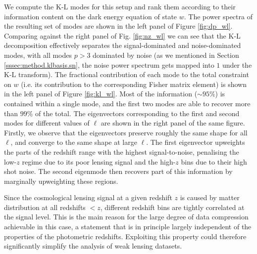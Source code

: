 \documentclass[twocolumn,amsfont,amssymb,amsmath, showpacs,balancelastpage, nofootinbib]{revtex4-1}
\begin{document}
    We compute the K-L modes for this setup and rank them according to their information content on the dark energy equation of state $w$. The power spectra of the resulting set of modes are shown in the left panel of Figure \ref{fig:dp_wl}. Comparing against the right panel of Fig. \ref{fig:nz_wl} we can see that the K-L decomposition effectively separates the signal-dominated and noise-dominated modes, with all modes $p>3$ dominated by noise (as we mentioned in Section \ref{sssec:method.klbasis.sn}, the noise power spectrum gets mapped into $1$ under the K-L transform). The fractional contribution of each mode to the total constraint on $w$ (i.e. its contribution to the corresponding Fisher matrix element) is shown in the left panel of Figure \ref{fig:kl_wl}. Most of the information ($\sim95\%$) is contained within a single mode, and the first two modes are able to recover more than $99\%$ of the total. The eigenvectors corresponding to the first and second modes for different values of $\ell$ are shown in the right panel of the same figure. Firstly, we observe that the eigenvectors preserve roughly the same shape for all $\ell$, and converge to the same shape at large $\ell$. The first eigenvector upweights the parts of the redshift range with the highest signal-to-noise, penalising the low-$z$ regime due to its poor lensing signal and the high-$z$ bins due to their high shot noise. The second eigenmode then recovers part of this information by marginally upweighting these regions.
    
    Since the cosmological lensing signal at a given redshift $z$ is caused by matter distribution at all redshifts $<z$, different redshift bins are tightly correlated at the signal level. This is the main reason for the large degree of data compression achievable in this case, a  statement that is in principle largely independent of the properties of the photometric redshifts. Exploiting this property could therefore significantly simplify the analysis of weak lensing datasets.
\end{document}
